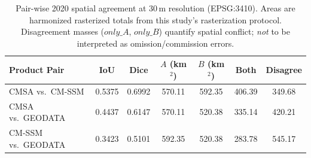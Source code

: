 \begin{table}[htpb]
\centering
\caption{\label{tab:spatial_agreement}Pair-wise 2020 spatial agreement at 30\,m
  resolution (EPSG:3410). Areas are harmonized rasterized totals from this study's
  rasterization protocol. Disagreement masses ($only\_A$, $only\_B$) quantify
  spatial conflict; \emph{not} to be interpreted as omission/commission errors.}
\begin{tabular}{l c c c c c c}
\toprule
Product Pair & IoU & Dice & $A$ (km$^2$) & $B$ (km$^2$) & Both & Disagree \\
\midrule
CMSA vs.\ CM-SSM & 0.5375 & 0.6992 & 570.11 & 592.35 & 406.39 & 349.68 \\
CMSA vs.\ GEODATA & 0.4437 & 0.6147 & 570.11 & 520.38 & 335.14 & 420.21 \\
CM-SSM vs.\ GEODATA & 0.3423 & 0.5101 & 592.35 & 520.38 & 283.78 & 545.17 \\
\bottomrule
\end{tabular}
\end{table}
